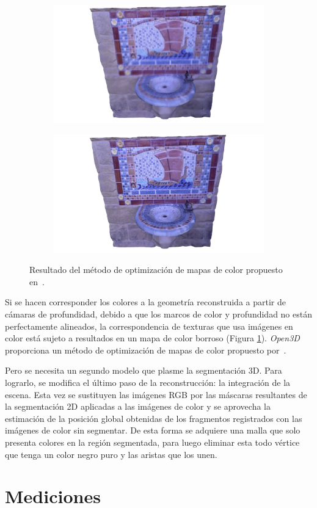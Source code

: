 {\begin{figure}[ht]
	\centering
	\begin{subfigure}
		\centering
		\includegraphics[width=.4\linewidth]{./Graphics/co1.png}
	\end{subfigure}
	\begin{subfigure}
		\centering
		\includegraphics[width=.4\linewidth]{./Graphics/co2.png}
	\end{subfigure}
	\caption{Resultado del método de optimización de mapas de color propuesto en~\cite{zhou2014color}.}
	\label{fig:optColor3d}
\end{figure}

Si se hacen corresponder los colores a la geometría reconstruida a partir de cámaras de profundidad, debido a que los marcos de color y profundidad no están perfectamente alineados, la correspondencia de texturas que usa imágenes en color está sujeto a resultados en un mapa de color borroso (Figura \ref{fig:optColor3d}). \textit{Open3D} proporciona un método de optimización de mapas de color propuesto por~\cite{zhou2014color}.

Pero se necesita un segundo modelo que plasme la segmentación 3D. Para lograrlo, se modifica el último paso de la reconstrucción: la integración de la escena. Esta vez se sustituyen las imágenes RGB por las máscaras resultantes de la segmentación 2D aplicadas a las imágenes de color y se aprovecha la estimación de la posición global obtenidas de los fragmentos registrados con las imágenes de color sin segmentar. De esta forma se adquiere una malla que solo presenta colores en la región segmentada, para luego eliminar esta todo vértice que tenga un color negro puro y las aristas que los unen.

\section{Mediciones}

}
